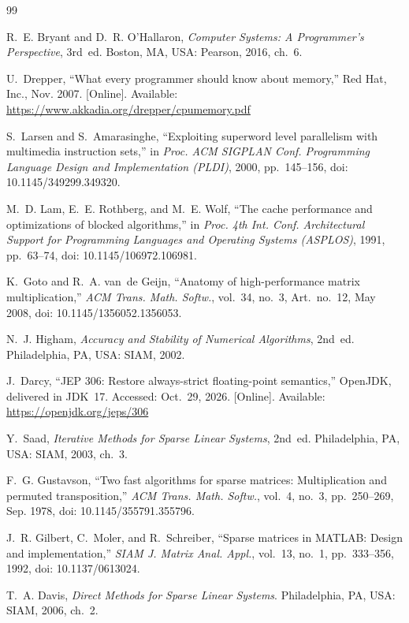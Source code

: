 \documentclass[11pt,a4paper]{article}
\begin{document}
\renewcommand{\refname}{References}
\begin{thebibliography}{99}\raggedright
\small

R.~E. Bryant and D.~R. O'Hallaron, \emph{Computer Systems: A Programmer's
Perspective}, 3rd~ed. Boston, MA, USA: Pearson, 2016, ch.~6.

U.~Drepper, ``What every programmer should know about memory,'' Red Hat, Inc.,
Nov. 2007. [Online]. Available: \url{https://www.akkadia.org/drepper/cpumemory.pdf}

S.~Larsen and S.~Amarasinghe, ``Exploiting superword level parallelism with
multimedia instruction sets,'' in \emph{Proc. ACM SIGPLAN Conf. Programming
Language Design and Implementation (PLDI)}, 2000, pp.~145--156,
doi: 10.1145/349299.349320.

M.~D. Lam, E.~E. Rothberg, and M.~E. Wolf, ``The cache performance and
optimizations of blocked algorithms,'' in \emph{Proc. 4th Int. Conf.
Architectural Support for Programming Languages and Operating Systems
(ASPLOS)}, 1991, pp.~63--74, doi: 10.1145/106972.106981.

K.~Goto and R.~A. van~de Geijn, ``Anatomy of high-performance matrix
multiplication,'' \emph{ACM Trans. Math. Softw.}, vol.~34, no.~3, Art.~no.~12,
May 2008, doi: 10.1145/1356052.1356053.

N.~J. Higham, \emph{Accuracy and Stability of Numerical Algorithms}, 2nd~ed.
Philadelphia, PA, USA: SIAM, 2002.

J.~Darcy, ``JEP 306: Restore always-strict floating-point semantics,''
OpenJDK, delivered in JDK~17. Accessed: Oct.~29, 2026. [Online]. Available:
\url{https://openjdk.org/jeps/306}

Y.~Saad, \emph{Iterative Methods for Sparse Linear Systems}, 2nd~ed.
Philadelphia, PA, USA: SIAM, 2003, ch.~3.

F.~G. Gustavson, ``Two fast algorithms for sparse matrices: Multiplication and
permuted transposition,'' \emph{ACM Trans. Math. Softw.}, vol.~4, no.~3,
pp.~250--269, Sep. 1978, doi: 10.1145/355791.355796.

J.~R. Gilbert, C.~Moler, and R.~Schreiber, ``Sparse matrices in MATLAB: Design
and implementation,'' \emph{SIAM J. Matrix Anal. Appl.}, vol.~13, no.~1,
pp.~333--356, 1992, doi: 10.1137/0613024.

T.~A. Davis, \emph{Direct Methods for Sparse Linear Systems}. Philadelphia, PA,
USA: SIAM, 2006, ch.~2.


\end{thebibliography}
\end{document}
